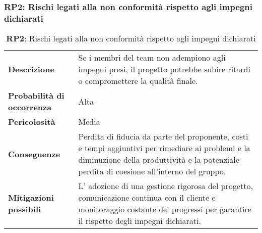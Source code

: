 \subsubsection{RP2: Rischi legati alla non conformità rispetto agli impegni dichiarati}
\label{sec:Rischi legati alla non conformità rispetto agli impegni dichiarati}
\begin{table}[h!]
    \centering
    \renewcommand{\arraystretch}{1.5} %
    \begin{tabularx}{\textwidth}{|X|X|}\hline
    \rowcolor[HTML]{FFD700} 
    \multicolumn{2}{|c|}{\textbf{Rischi legati alla non conformità rispetto agli impegni dichiarati}} \\ \hline
    \textbf{Descrizione} &  Se i membri del team non adempiono agli impegni presi, 
    il progetto potrebbe subire ritardi o compromettere la qualità finale. \\ \hline
    \textbf{Probabilità di occorrenza} & Alta \\ \hline
    \textbf{Pericolosità} & Media \\ \hline
    \textbf{Conseguenze} & Perdita di fiducia da parte del proponente, costi e tempi aggiuntivi per rimediare ai problemi e la diminuzione della produttività e la potenziale perdita di coesione all'interno del gruppo. \\ \hline
    \textbf{Mitigazioni possibili} & L' adozione di una gestione rigorosa del progetto, comunicazione continua con il cliente e monitoraggio costante dei progressi per garantire il rispetto degli impegni dichiarati.\\ \hline
    \end{tabularx}
    \caption{\textbf{RP2}: Rischi legati alla non conformità rispetto agli impegni dichiarati}
    \end{table}
